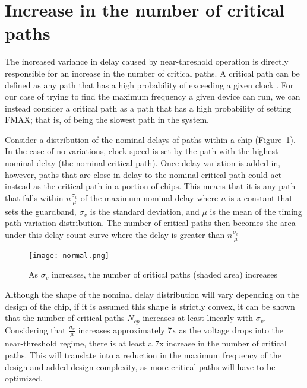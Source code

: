 \section{Increase in the number of critical paths}
\label{sec:criticalpaths}

The increased variance in delay caused by near-threshold operation is directly responsible for an increase in the number of critical paths.
A critical path can be defined as any path that has a high probability of exceeding a given clock \cite{Wang:2004bw}.
For our case of trying to find the maximum frequency a given device can run, we can instead consider a critical path as a path that has a high probability of setting FMAX; that is, of being the slowest path in the system.
  
Consider a distribution of the nominal delays of paths within a chip (Figure~\ref{fig:normal}).
In the case of no variations, clock speed is set by the path with the highest nominal delay (the nominal critical path).
Once delay variation is added in, however, paths that are close in delay to the nominal critical path could act instead as the critical path in a portion of chips.
This means that it is any path that falls within $n\frac{\sigma_v}{\mu}$ of the maximum nominal delay where $n$ is a constant that sets the guardband, $\sigma_v$ is the standard deviation, and $\mu$ is the mean of the timing path variation distribution.
The number of critical paths then becomes the area under this delay-count curve where the delay is greater than $n\frac{\sigma_v}{\mu}$
 
\begin{figure}[thpb]
    \centering
    \texttt{[image: normal.png]}
    \caption{As $\sigma_v$ increases, the number of critical paths (shaded area) increases}
    \label{fig:normal}
\end{figure}
 
 Although the shape of the nominal delay distribution will vary depending on the design of the chip, if it is assumed this shape is strictly convex, it can be shown that the number of critical paths $N_{cp}$ increases at least linearly with $\sigma_v$.
Considering that $\frac{\sigma_v}{\mu}$ increases approximately 7x as the voltage drops into the near-threshold regime, there is at least a 7x increase in the number of critical paths.
This will translate into a reduction in the maximum frequency of the design\cite{Bowman:2002cp} and added design complexity, as more critical paths will have to be optimized.

